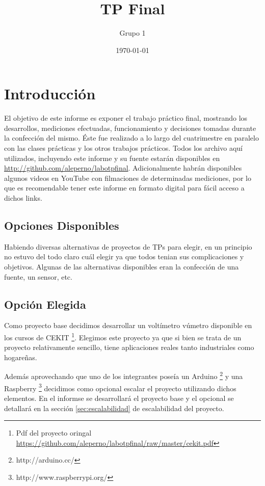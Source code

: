 \documentclass[12pt,a4paper]{article}
\title{TP Final}
\author{
        Grupo 1
}
\date{\today}
\begin{document}


\maketitle

\newpage
\tableofcontents

\newpage


\newpage 
\section{Introducción}
	El objetivo de este informe es exponer el trabajo práctico final, mostrando los desarrollos, mediciones efectuadas, funcionamiento y decisiones tomadas durante la confección del mismo. Éste fue realizado a lo largo del cuatrimestre en paralelo con las clases prácticas y los otros trabajos prácticos. Todos los archivo aquí utilizados, incluyendo este informe y su fuente estarán disponibles en \url{http://github.com/aleperno/labotpfinal}. Adicionalmente habrán disponibles algunos videos en YouTube con filmaciones de determinadas mediciones, por lo que es recomendable tener este informe en formato digital para fácil acceso a dichos links.

	\subsection{Opciones Disponibles}
		Habiendo diversas alternativas de proyectos de TPs para elegir, en un principio no estuvo del todo claro cuál elegir ya que todos tenian sus complicaciones y objetivos. Algunas de las alternativas disponibles eran la confección de una fuente, un sensor, etc.

	\subsection{Opción Elegida}
		Como proyecto base decidimos desarrollar un voltímetro vúmetro disponible en los cursos de CEKIT \footnote{Pdf del proyecto oringal \url{https://github.com/aleperno/labotpfinal/raw/master/cekit.pdf}}. Elegimos este proyecto ya que si bien se trata de un proyecto relativamente sencillo, tiene aplicaciones reales tanto industriales como hogareñas.

		Además aprovechando que uno de los integrantes poseía un Arduino \footnote{http://arduino.cc/} y una Raspberry \footnote{http://www.raspberrypi.org/} decidimos como opcional escalar el proyecto utilizando dichos elementos. En el informse se desarrollará el proyecto base y el opcional se detallará en la sección \ref{sec:escalabilidad} de escalabilidad del proyecto.
\end{document}
